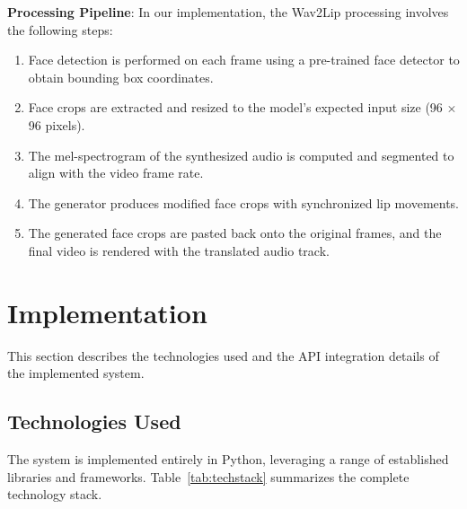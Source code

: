 \documentclass[conference]{IEEEtran}
\begin{document}
\textbf{Processing Pipeline}: In our implementation, the Wav2Lip processing involves the following steps:
\begin{enumerate}
    \item Face detection is performed on each frame using a pre-trained face detector to obtain bounding box coordinates.
    \item Face crops are extracted and resized to the model's expected input size (96 $\times$ 96 pixels).
    \item The mel-spectrogram of the synthesized audio is computed and segmented to align with the video frame rate.
    \item The generator produces modified face crops with synchronized lip movements.
    \item The generated face crops are pasted back onto the original frames, and the final video is rendered with the translated audio track.
\end{enumerate}

\section{Implementation}

This section describes the technologies used and the API integration details of the implemented system.

\subsection{Technologies Used}

The system is implemented entirely in Python, leveraging a range of established libraries and frameworks. Table~\ref{tab:techstack} summarizes the complete technology stack.
\end{document}
